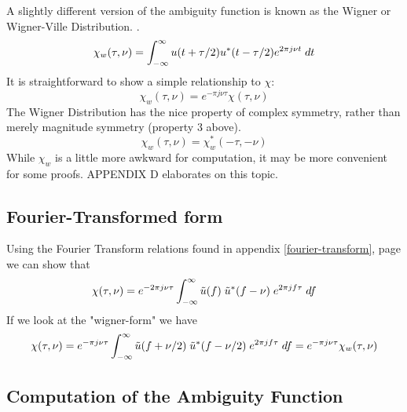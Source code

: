 A slightly different version of the ambiguity function is known as the
Wigner or Wigner-Ville Distribution. \cite{something}.
\begin{equation}
\chi_w(\tau,\nu) = \int_{-\infty}^\infty u(t + \tau/2) u^\ast(t-\tau/2) e^{2\pi j\nu t} \; dt 
\end{equation}
It is straightforward to show a simple relationship to $\chi$:
\begin{equation}
\chi_w(\tau,\nu) = e^{-\pi j \nu \tau} \chi(\tau, \nu)
\end{equation}
The Wigner Distribution has the nice property of complex symmetry, rather than
merely magnitude symmetry (property 3 above).
\begin{equation}
\chi_w(\tau,\nu) = \chi^\ast_w(-\tau,-\nu) 
\end{equation}
While $\chi_w$ is a little more awkward for computation, it may be more convenient for some proofs.
APPENDIX D elaborates on this topic.

\subsection{Fourier-Transformed form} 

Using the Fourier Transform relations found in appendix
\ref{fourier-transform}, page \pageref{fourier-transform}
we can show that
\begin{equation} \label{e:AF-def-alt}
\chi(\tau,\nu) = e^{-2\pi j \nu \tau} \int_{-\infty}^\infty \tilde{u}(f)\;
\tilde{u}^\ast(f-\nu) \;e^{2\pi j f \tau} \;df 
\end{equation}
If we look at the "wigner-form" we have
\begin{equation} \label{e:AF-def-alt}
\chi(\tau,\nu) = e^{-\pi j \nu \tau} \int_{-\infty}^\infty \tilde{u}(f + \nu/2)\;
\tilde{u}^\ast(f-\nu/2) \;e^{2\pi j f \tau} \;df  = e^{-\pi j \nu \tau} \chi_w(\tau,\nu)
\end{equation}
 


\subsection{Computation of the Ambiguity Function}

